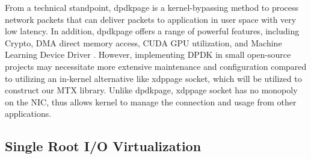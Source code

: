 From a technical standpoint, \ac{dpdkpage} is a kernel-bypassing method to process network packets that can deliver packets to application in user space with very low latency.
In addition, \ac{dpdkpage} offers a range of powerful features, including Crypto, DMA direct memory access, CUDA GPU utilization, and Machine Learning Device Driver \cite{dpdk_guide_page}. 
However, implementing DPDK in small open-source projects may necessitate more extensive maintenance and configuration compared to utilizing an in-kernel alternative like \ac{xdppage} socket, which will be utilized to construct our MTX library.
Unlike \ac{dpdkpage}, \ac{xdppage} socket has no monopoly on the \ac{NIC}, thus allows kernel to manage the connection and usage from other applications.

\subsection{Single Root I/O Virtualization}










